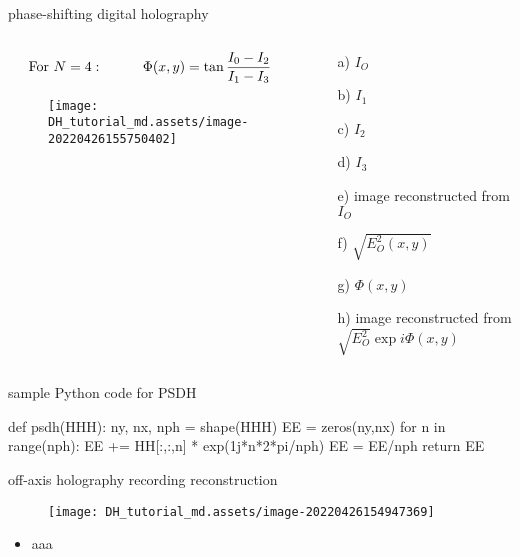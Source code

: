 \documentclass[t, aspectratio=169]{beamer}
\begin{document}
\begin{frame}{phase-shifting digital holography}
	\begin{columns}
		\begin{column}{0.5\textwidth}
			\vspace{-5 mm}
\[ \textrm{For  } N=4:\hspace{10 mm} \Phi(x,y) = \tan\frac{I_0 - I_2}{I_1 - I_3} \]	
			\begin{figure}
				\texttt{[image: DH\_tutorial\_md.assets/image-20220426155750402]}
			\end{figure}
		\end{column}
		\begin{column}{0.5\textwidth}		
		\begin{itemize}
			\item[a)] $ I_O $
			\item[b)] $ I_1 $
			\item[c)] $ I_2 $
			\item[d)] $ I_3 $
			\item[e)] image reconstructed from $ I_O $
			\item[f)] $ \sqrt{E_O^2(x,y)}
			 $
			\item[g)] $ \Phi(x,y) $
			\item[h)] image reconstructed from $ \sqrt{E_O^2}\exp{i\Phi(x,y)} $
		\end{itemize}	
		\end{column}
	\end{columns}
\end{frame}


\begin{frame}[fragile]{sample Python code for PSDH}
	\begin{semiverbatim}
def psdh(HHH):
	ny, nx, nph = shape(HHH)
	EE = zeros(ny,nx)
	for n in range(nph):
		EE += HH[:,:,n] * exp(1j*n*2*pi/nph)
    EE = EE/nph
    return EE
	\end{semiverbatim}
\end{frame}


\begin{frame}{off-axis holography}
	\hspace{30 mm} recording \hspace{50 mm} reconstruction
	\begin{figure}
		\texttt{[image: DH\_tutorial\_md.assets/image-20220426154947369]}
	\end{figure}
	\begin{itemize}
		\item aaa
	\end{itemize}
\end{frame}
\end{document}
